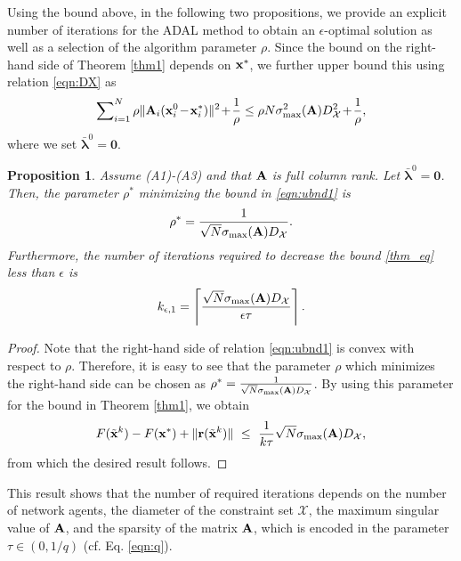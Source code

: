 \documentclass[doublecolumn]{IEEEtran}
\newtheorem{prop}{\bf \noindent Proposition}
\def\0b{\mathbf{0}}
\begin{document}
\vspace{3pt}

Using the bound above, in the following two propositions,
we provide an explicit number of iterations for the ADAL method
to obtain an $\epsilon$-optimal solution
as well as a selection of the algorithm parameter $\rho$.
Since the bound on the right-hand side of Theorem \ref{thm1} depends on ${ {\bf x} }^*$,
we further upper bound this using relation \eqref{eqn:DX} as
\begin{align}\label{eqn:ubnd1}
\sum\nolimits_{i=1}^N {\rho}\|{ {\bf A} }_i({ {\bf x} }_i^0\hspace{-0.5mm}-\hspace{-0.5mm}{ {\bf x} }_i^*)\|^2 \hspace{-0.5mm}+\hspace{-0.5mm}\frac{1}{\rho}
\le \rho N\sigma_{\max}^2({ {\bf A} })D_{ \mathcal{X} }^2 \hspace{-0.5mm}+\hspace{-0.5mm} \frac{1}{\rho},
\end{align}
where we set $\bar {\boldsymbol{\lambda}}^0 = \0b$.

\begin{prop}
Assume (A1)-(A3) and that ${ {\bf A} }$ is full column rank. Let $\bar {\boldsymbol{\lambda}}^0 = \0b$.
Then, the parameter $\rho^*$ minimizing the bound in \eqref{eqn:ubnd1} is
\begin{align*}
\rho^* = \frac{1}{\sqrt{N}\sigma_{\max}({ {\bf A} })D_{ \mathcal{X} }}.
\end{align*}
Furthermore, the number of iterations required to decrease the bound \eqref{thm_eq} less than $\epsilon$ is
\begin{align*}
k_{\epsilon,1} = \left\lceil \frac{\sqrt{N}\sigma_{\max}({ {\bf A} })D_{ \mathcal{X} }}{\epsilon\tau}\right\rceil.
\end{align*}
\end{prop}
\begin{proof}
Note that the right-hand side of relation \eqref{eqn:ubnd1} is convex with respect to $\rho$.
Therefore, it is easy to see that the parameter $\rho$ which minimizes the right-hand side can be chosen as
$\rho^* = \frac{1}{\sqrt{N}\sigma_{\max}({ {\bf A} })D_{ \mathcal{X} }}$.
By using this parameter for the bound in Theorem \ref{thm1}, we obtain
\begin{align*}
F({ \tilde{\bf x} }^k) -  F({ {\bf x} }^*) + \|{ {\bf r} }( { \tilde{\bf x} }^k)\| ~\leq~ \frac{1}{k\tau} \sqrt{N}\sigma_{\max}({ {\bf A} })D_{ \mathcal{X} },
\end{align*}
from which the desired result follows.
\end{proof}
\vspace{3pt}
This result shows that the number of required iterations depends on the number of network agents,
the diameter of the constraint set ${ \mathcal{X} }$,
the maximum singular value of ${ {\bf A} }$, and
the sparsity of the matrix ${ {\bf A} }$, which is encoded in the parameter $\tau \in (0,1/q)$ (cf. Eq. \eqref{eqn:q}).
\end{document}
